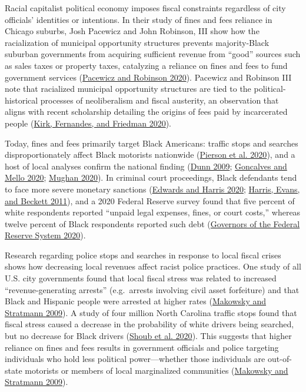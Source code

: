 \documentclass[
  12pt,
]{article}
\begin{document}
Racial capitalist political economy imposes fiscal constraints regardless of city officials' identities or intentions. In their study of fines and fees reliance in Chicago suburbs, Josh Pacewicz and John Robinson, III show how the racialization of municipal opportunity structures prevents majority-Black suburban governments from acquiring sufficient revenue from ``good'' sources such as sales taxes or property taxes, catalyzing a reliance on fines and fees to fund government services (\protect\hyperlink{ref-Pacewicz2020}{Pacewicz and Robinson 2020}). Pacewicz and Robinson III note that racialized municipal opportunity structures are tied to the political-historical processes of neoliberalism and fiscal austerity, an observation that aligns with recent scholarship detailing the origins of fees paid by incarcerated people (\protect\hyperlink{ref-Kirk2020}{Kirk, Fernandes, and Friedman 2020}).

Today, fines and fees primarily target Black Americans: traffic stops and searches disproportionately affect Black motorists nationwide (\protect\hyperlink{ref-Pierson2020}{Pierson et al. 2020}), and a host of local analyses confirm the national finding (\protect\hyperlink{ref-Dunn2009}{Dunn 2009}; \protect\hyperlink{ref-Goncalves2020}{Goncalves and Mello 2020}; \protect\hyperlink{ref-Mughan2020}{Mughan 2020}). In criminal court proceedings, Black defendants tend to face more severe monetary sanctions (\protect\hyperlink{ref-Edwards2020}{Edwards and Harris 2020}; \protect\hyperlink{ref-Harris2011}{Harris, Evans, and Beckett 2011}), and a 2020 Federal Reserve survey found that five percent of white respondents reported ``unpaid legal expenses, fines, or court costs,'' whereas twelve percent of Black respondents reported such debt (\protect\hyperlink{ref-BoardofGovernorsoftheFederalReserveSystem2020}{Governors of the Federal Reserve System 2020}).

Research regarding police stops and searches in response to local fiscal crises shows how decreasing local revenues affect racist police practices. One study of all U.S. city governments found that local fiscal stress was related to increased ``revenue-generating arrests'' (e.g.~arrests involving civil asset forfeiture) and that Black and Hispanic people were arrested at higher rates (\protect\hyperlink{ref-Makowsky2009}{Makowsky and Stratmann 2009}). A study of four million North Carolina traffic stops found that fiscal stress caused a decrease in the probability of white drivers being searched, but no decrease for Black drivers (\protect\hyperlink{ref-Shoub2020}{Shoub et al. 2020}). This suggests that higher reliance on fines and fees results in government officials and police targeting individuals who hold less political power---whether those individuals are out-of-state motorists or members of local marginalized communities (\protect\hyperlink{ref-Makowsky2009}{Makowsky and Stratmann 2009}).
\end{document}
